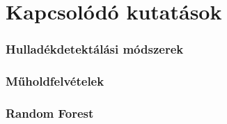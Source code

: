 \chapter{Kapcsolódó kutatások}
\label{ch:related_research}

\subsection{Hulladékdetektálási módszerek}

\subsection{Műholdfelvételek}

\subsection{Random Forest}

